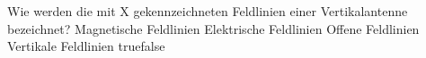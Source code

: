     {Wie werden die mit X gekennzeichneten Feldlinien einer Vertikalantenne bezeichnet?}
    {Magnetische Feldlinien}
    {Elektrische Feldlinien}
    {Offene Feldlinien}
    {Vertikale Feldlinien}
    {true}{false}